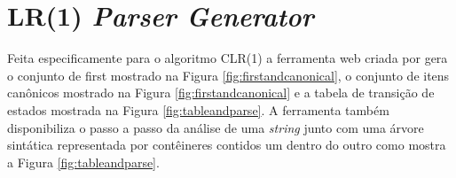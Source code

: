 \begin{figure}[ht]
    \captionsetup{width=16cm}
    {}
\end{figure}
\FloatBarrier

\section{LR(1) \textit{Parser Generator}}
Feita especificamente para o algoritmo CLR(1) a ferramenta web criada por \textcite{LR-2024-04-12} gera o conjunto de first mostrado na Figura \ref{fig:firstandcanonical}, o conjunto de itens canônicos mostrado na Figura \ref{fig:firstandcanonical} e a tabela de transição de estados mostrada na Figura \ref{fig:tableandparse}. A ferramenta também disponibiliza o passo a passo da análise de uma \textit{string} junto com uma árvore sintática representada por contêineres contidos um dentro do outro como mostra a Figura \ref{fig:tableandparse}.

